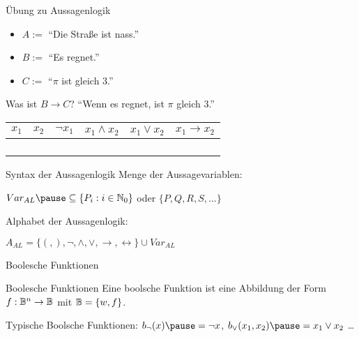 \begin{frame}{Übung zu Aussagenlogik}
	
	\begin{itemize}
		\item $A := $ ``Die Straße ist nass.''
		\item $B := $ ``Es regnet.''
		\item $C := $ ``$\pi$ ist gleich $3$.''
	\end{itemize}

	\begin{itemize}
		\pitem Was ist $B \rightarrow C$? \pause ``Wenn es regnet, ist $\pi$ gleich $3$.''
	\end{itemize}

	\pause
	
	\begin{center}
		\begin{tabular}{c|c||c|c|c|c}%
			\hline
			$x_1$ & $x_2$ & $\lnot x_1$ & $x_1 \land x_2$ & $x_1 \lor x_2$ & $x_1 \rightarrow x_2$ \\
			\hline
			\F & \F & \W & \F & \F & \W \\
			\F & \W & \W & \F & \W & \W \\
			\W & \F & \F & \F & \W & \F \\
			\W & \W & \F & \W & \W & \W \\
			\hline
		\end{tabular}
	\end{center}
	
\end{frame}

\begin{frame}{Syntax der Aussagenlogik}
	\pause
	Menge der Aussagevariablen:
	
	\pause\quad $Var_{AL} \pause \subseteq \{P_i : i \in \N_0\}$ \pause oder $\{P, Q, R, S, \dots\}$
	
	\pause Alphabet der Aussagenlogik:
	
	\pause\quad $A_{AL} = \{(, ), \lnot, \land, \lor, \rightarrow, \leftrightarrow\} \cup Var_{AL}$
\end{frame}

\begin{frame}{Boolesche Funktionen}
\begin{block}{Boolesche Funktionen}
	Eine boolsche Funktion ist eine Abbildung \pause der Form $f: \mathbb{B}^n \rightarrow \mathbb{B}$ \pause mit $\mathbb{B} = \{w, f\}$.
\end{block}

Typische Boolsche Funktionen\pause : $b_\lnot (x) \pause = \lnot x$\pause , $b_\lor (x_1, x_2) \pause = x_1 \lor x_2$ \dots
\end{frame}

